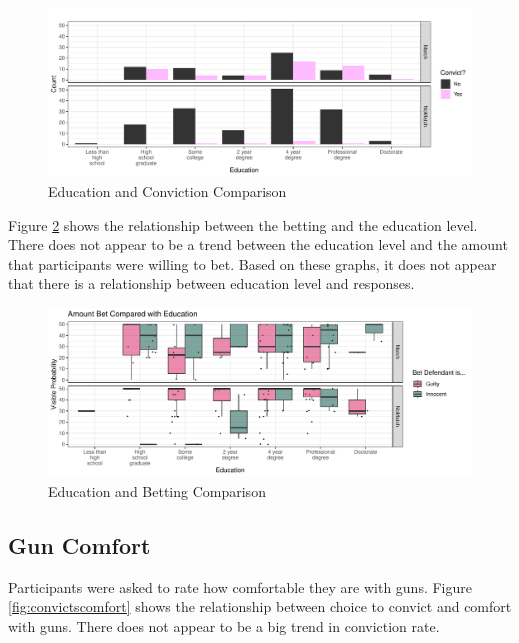 \documentclass[print]{nuthesis}
\begin{document}
\begin{figure}

{\centering \includegraphics[width=\linewidth]{thesis_files/figure-latex/convictseduc-1} 

}

\caption{Education and Conviction Comparison}\label{fig:convictseduc}
\end{figure}

Figure \ref{fig:educbet} shows the relationship between the betting and the education level.
There does not appear to be a trend between the education level and the amount that participants were willing to bet.
Based on these graphs, it does not appear that there is a relationship between education level and responses.

\begin{figure}

{\centering \includegraphics[width=\linewidth]{thesis_files/figure-latex/educbet-1} 

}

\caption{Education and Betting Comparison}\label{fig:educbet}
\end{figure}

\hypertarget{gun-comfort}{%
\subsection{Gun Comfort}\label{gun-comfort}}

Participants were asked to rate how comfortable they are with guns.
Figure \ref{fig:convictscomfort} shows the relationship between choice to convict and comfort with guns.
There does not appear to be a big trend in conviction rate.
\end{document}
